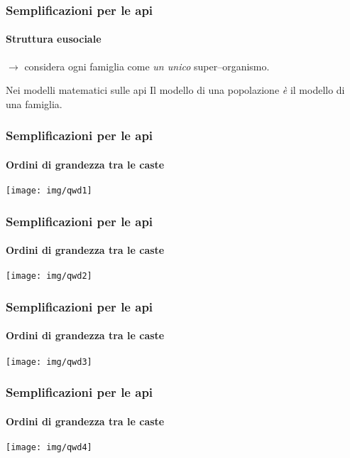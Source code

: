 \documentclass[]{beamer}
\begin{document}
\begin{frame}
    \frametitle{Semplificazioni per le api}
    \framesubtitle{Struttura eusociale}

    $\rightarrow$ considera ogni famiglia come \emph{un unico} super--organismo.

    \pause
    \begin{alertblock}{Nei modelli matematici sulle api}
        Il modello di una popolazione \emph{è} il modello di una famiglia.
    \end{alertblock}
\end{frame}

\begin{frame}
    \frametitle{Semplificazioni per le api}
    \framesubtitle{Ordini di grandezza tra le caste}

    \begin{center}
        \texttt{[image: img/qwd1]}
    \end{center}
\end{frame}

\begin{frame}
    \frametitle{Semplificazioni per le api}
    \framesubtitle{Ordini di grandezza tra le caste}

    \begin{center}
        \texttt{[image: img/qwd2]}
    \end{center}
\end{frame}

\begin{frame}
    \frametitle{Semplificazioni per le api}
    \framesubtitle{Ordini di grandezza tra le caste}

    \begin{center}
        \texttt{[image: img/qwd3]}
    \end{center}
\end{frame}

\begin{frame}
    \frametitle{Semplificazioni per le api}
    \framesubtitle{Ordini di grandezza tra le caste}

    \begin{center}
        \texttt{[image: img/qwd4]}
    \end{center}
\end{frame}
\end{document}
